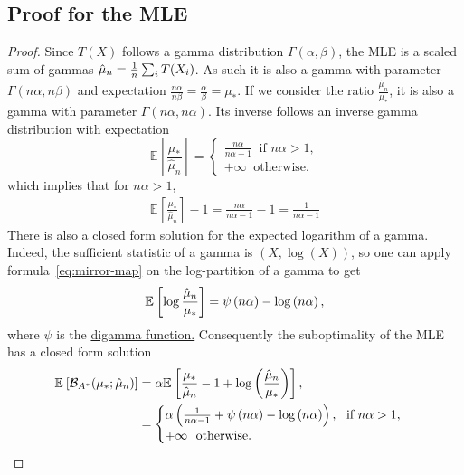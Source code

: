 \documentclass[twoside]{article}
\newcommand*{\expect}[2][]{\ensuremath{\mathbb{E}_{#1} \left[ #2 \right] }} %
\newcommand{\logpart}{A}
\newcommand{\bregmanconj}{\cB_{\logpart^*}}
\newcommand{\m}{\mu}
\newcommand{\MAPm}{\hat \m_n}
\begin{document}
\subsection{Proof for the MLE}
	\label{app:gammaMLE}
	
	\begin{proof}
	Since $T(X)$ follows a gamma distribution $\Gamma(\alpha, \beta)$, the MLE is a scaled sum of gammas $\hat \mu_n = \frac{1}{n} \sum_i T(X_i)$.
	As such it is also a gamma with parameter $\Gamma(n \alpha, n \beta)$ and expectation $\frac{n\alpha}{n\beta} = \frac{\alpha}{\beta} = \mu_*$.
	If we consider the ratio $\frac{\MAPm}{\mu_*}$, it is also a gamma with parameter $\Gamma(n \alpha, n \alpha)$.
	Its inverse follows an inverse gamma distribution with expectation
	\begin{equation}
		\expect{\frac{\mu_*}{\hat \mu_n}} 
		= \begin{cases}
			\frac{n\alpha}{n \alpha -1 }\ \text{ if } n\alpha > 1, \\
			+\infty \  \text{ otherwise. }
		\end{cases}
	\end{equation}
	which implies that for $n\alpha>1$, 
	\begin{align}
		\expect{\frac{\mu_*}{\hat \mu_n}} -1  
		= \frac{n \alpha}{n\alpha -1 } - 1
		= \frac{1}{n \alpha -1}
	\end{align}
	There is also a closed form solution for the expected logarithm of a gamma.
	Indeed, the sufficient statistic of a gamma is $(X, \log(X))$, so one can apply formula~\eqref{eq:mirror-map} on the log-partition of a gamma to get
	\begin{align}
		\expect{\log \frac{\hat \mu_n}{\mu_*}} 
		= \psi\paren{n \alpha} - \log\paren{n \alpha},
	\end{align}
	where $\psi$ is the \href{https://en.wikipedia.org/wiki/Digamma_function}{digamma function.}
	Consequently the suboptimality of the MLE has a closed form solution
	\begin{align}
	\expect{\bregmanconj( \mu_*; \hat \mu_n) }
	&= \alpha \expect{\frac{\mu_*}{ \hat \mu_n} - 1 + \log \left(\frac{\hat \mu_n}{\mu_*} \right) },
	\\
	& =
	\begin{cases}
		\alpha \paren{ \frac{1}{n\alpha - 1} + \psi\paren{n \alpha} - \log\paren{n \alpha} }, \ \text{ if } n\alpha>1, \\
			+\infty \  \text{ otherwise. }

\end{cases}
\end{align}
\end{proof}
\end{document}

